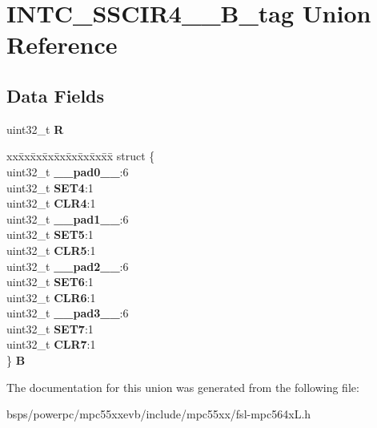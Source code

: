 \hypertarget{unionINTC__SSCIR4__7__32B__tag}{}\section{I\+N\+T\+C\+\_\+\+S\+S\+C\+I\+R4\+\_\+\_\+B\+\_\+tag Union Reference}
\label{unionINTC__SSCIR4__7__32B__tag}
\subsection*{Data Fields}
\begin{DoxyCompactItemize}
\item 
\mbox{\label{unionINTC__SSCIR4__7__32B__tag_a5a6817cba932b2c640d9609d6508eeca}} 
uint32\+\_\+t {\bfseries R}
\item 
\mbox{\label{unionINTC__SSCIR4__7__32B__tag_a61674ca990fed4a83e4f6cf0e0371e4d}} 
\begin{tabbing}
xx\=xx\=xx\=xx\=xx\=xx\=xx\=xx\=xx\=\kill
struct \{\\
\>uint32\_t {\bfseries \_\_pad0\_\_}:6\\
\>uint32\_t {\bfseries SET4}:1\\
\>uint32\_t {\bfseries CLR4}:1\\
\>uint32\_t {\bfseries \_\_pad1\_\_}:6\\
\>uint32\_t {\bfseries SET5}:1\\
\>uint32\_t {\bfseries CLR5}:1\\
\>uint32\_t {\bfseries \_\_pad2\_\_}:6\\
\>uint32\_t {\bfseries SET6}:1\\
\>uint32\_t {\bfseries CLR6}:1\\
\>uint32\_t {\bfseries \_\_pad3\_\_}:6\\
\>uint32\_t {\bfseries SET7}:1\\
\>uint32\_t {\bfseries CLR7}:1\\
\} {\bfseries B}\\

\end{tabbing}\end{DoxyCompactItemize}


The documentation for this union was generated from the following file\+:\begin{DoxyCompactItemize}
\item 
bsps/powerpc/mpc55xxevb/include/mpc55xx/fsl-\/mpc564x\+L.\+h\end{DoxyCompactItemize}
